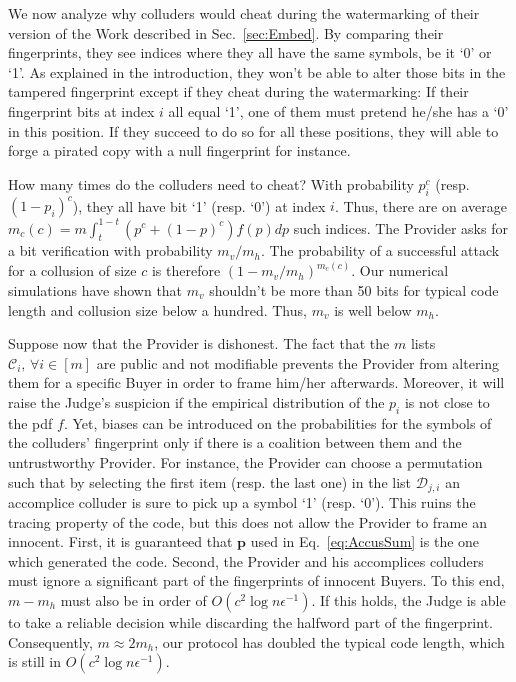\documentclass{article}
\begin{document}
We now analyze why colluders would cheat during the watermarking
of their version of the Work described in Sec.~\ref{sec:Embed}.
By comparing their fingerprints, they see indices where they all have the same symbols,
be it `0' or `1'. As explained in the introduction, they won't be able to alter those bits in the tampered fingerprint except if they cheat during the watermarking: 
If their fingerprint bits at index $i$ all equal `1', one of them must pretend he/she has a `0' in this position. If they succeed to do so for all these positions, they will able to forge a pirated copy with a null fingerprint for instance. 

How many times do the colluders need to cheat?
With probability $p_i^c$ (resp. $(1-p_i)^c$), they all have bit `1'
(resp. `0') at index $i$. Thus, there are on average $m_c(c)=m\int_t^{1-t}
(p^c+(1-p)^c)f(p)dp$ such indices. The Provider asks for a bit verification with probability $m_v/m_h$. The probability of a
successful attack for a collusion of size $c$ is therefore
$(1-m_v/m_h)^{m_c(c)}$.
Our numerical simulations have shown that $m_v$ shouldn't be more than 50 bits for typical code length and collusion size below a hundred. Thus, $m_v$ is well below $m_h$. 

Suppose now that the Provider is dishonest. The fact that the $m$
lists $\mathcal{C}_{i},\,\forall i\in[m]$ are public and not
modifiable prevents the Provider from altering them for a specific
Buyer in order to frame him/her afterwards. Moreover, it will raise the
Judge's suspicion if the empirical distribution of the $p_i$ is not
close to the pdf $f$.  Yet, biases can be introduced on the probabilities
for the symbols of the colluders' fingerprint only if there is a
coalition between them and the untrustworthy Provider. For instance, the
Provider can choose a permutation such that by selecting the first
item (resp. the last one) in the list $\mathcal{D}_{j,i}$ an accomplice colluder
is sure to pick up a symbol `1' (resp. `0'). This ruins the tracing
property of the code, but this does not
allow the Provider to frame an innocent.  First, it is guaranteed that
$\mathbf{p}$ used in Eq.~\ref{eq:AccusSum} is the one which generated
the code. Second, the Provider and his accomplices colluders must ignore a significant part of the fingerprints of innocent Buyers. To this end, $m-m_h$ must also be in order of $O(c^2\log n\epsilon^{-1})$. If this holds, the Judge is able to take a reliable decision while discarding the halfword part of the fingerprint. Consequently, $m\approx 2m_h$, our protocol has doubled the typical code length, which is still in $O(c^2\log n\epsilon^{-1})$.
\end{document}
